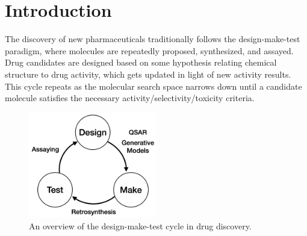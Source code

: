 \chapter{Introduction} \label{ch:intro}




The discovery of new pharmaceuticals traditionally follows the design-make-test paradigm, where molecules are repeatedly proposed, synthesized, and assayed. Drug candidates are designed based on some hypothesis relating chemical structure to drug activity, which gets updated in light of new activity results. This cycle repeats as the molecular search space narrows down until a candidate molecule satisfies the necessary activity/selectivity/toxicity criteria.

\begin{figure}[!h] %
    \centering
    \includegraphics[width=0.5\textwidth]{Chapters/Intro/Figs/design-make-test.png}
    \caption{\label{fig:cycle} An overview of the design-make-test cycle in drug discovery.}
\end{figure}

